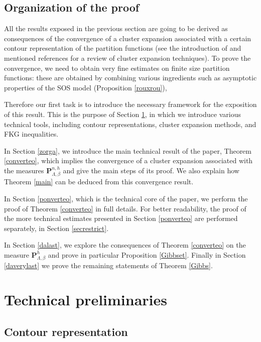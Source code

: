 \documentclass[JEP,XML,SOM,Unicode, NoFloatCountersInSection]{cedram}
\numberwithin{equation}{section}
\theoremstyle{plain}
\theoremstyle{definition}
\newcommand{\bP}{{\ensuremath{\mathbf P}} }
\newcommand{\gb}{\beta}
\newcommand{\gL}{\Lambda}
\begin{document}
\subsection{Organization of the proof}

All the results exposed in the previous section are going to be derived as consequences of the
convergence of a cluster expansion associated with a certain contour representation of the partition functions (see the introduction of \cite{cf:BFP} and mentioned references
for a review of cluster expansion techniques).
To prove the convergence, we need to obtain very fine estimates on finite size partition functions: these are obtained by combining various ingredients such as
asymptotic properties of the SOS model (Proposition \ref{rouxrou}),

Therefore our first task is to introduce the necessary framework for the exposition of this result.
This is the purpose of Section \ref{tools}, in which we introduce various technical tools, including contour representations,
cluster expansion methods, and FKG inequalities.

In Section \ref{zorga}, we introduce the main technical result of the paper, Theorem \ref{converteo}, which implies the convergence of a cluster expansion associated with the measures
$\bP^{n,h}_{\gL,\gb}$
and give the main steps of its proof.
We also explain how Theorem \ref{main} can be deduced from this convergence result.

In Section \ref{ponverteo}, which is the technical core of the paper, we perform the proof of Theorem \ref{converteo} in full details.
For better readability, the proof of the more technical estimates presented in Section \ref{ponverteo} are performed separately, in Section \ref{secrestrict}.

In Section \ref{dalast}, we explore the consequences of Theorem \ref{converteo} on the measure $\bP^h_{\gL,\gb}$ and prove in particular Proposition \ref{Gibbset}.
Finally in Section \ref{daverylast} we prove the remaining statements of Theorem \ref{Gibbs}.

\section{Technical preliminaries}\label{tools}

\subsection{Contour representation}\label{contour}
\end{document}
